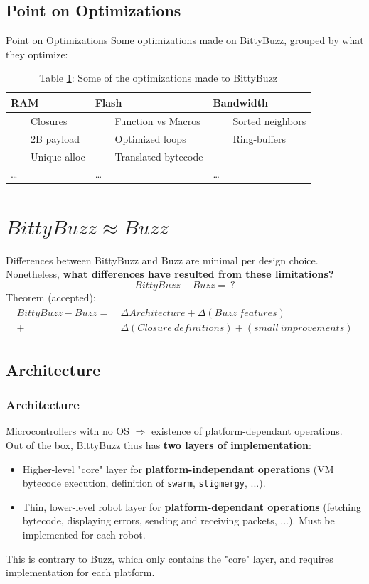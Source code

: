 \documentclass{beamer}
\newcommand{\tabitem}{~~\llap{\color{darkorange}\textbullet}~~}
\begin{document}
	\subsection{Point on Optimizations}
	\begin{frame}{Point on Optimizations}
		Some optimizations made on BittyBuzz, grouped by what they optimize:
		\begin{table}
			\begin{tabular}{l|l|l}
				RAM & Flash & Bandwidth\\
				\hline
				\tabitem Closures & \tabitem Function vs Macros & \tabitem Sorted neighbors\\
				\tabitem 2B payload & \tabitem Optimized loops & \tabitem Ring-buffers\\
				\tabitem Unique alloc & \tabitem Translated bytecode &\\
				\dots & \dots & \dots
			\end{tabular}
			\caption{
				\label{table:Optimizations}Table \ref{table:Optimizations}: Some of the optimizations made to BittyBuzz}
		\end{table}
	\end{frame}
	\section{$BittyBuzz \approx Buzz$}
	\begin{frame}
		Differences between BittyBuzz and Buzz are minimal per design choice. Nonetheless, \textbf{what differences have resulted from these limitations?}\\
		\[BittyBuzz - Buzz =~?\]
		Theorem (accepted):
		\begin{align}
		\begin{split}
		BittyBuzz - Buzz = ~&\Delta Architecture + \Delta (Buzz~features)\\
		+ &\Delta (Closure~definitions) + (small~improvements)
		\end{split}
		\end{align}
	\end{frame}
	\subsection{Architecture}
	\begin{frame}
		\frametitle{Architecture}
		Microcontrollers with no OS $\Rightarrow$ existence of platform-dependant operations.\\
		Out of the box, BittyBuzz thus has \textbf{two layers of implementation}:
		\begin{itemize}
			\item Higher-level "core" layer for \textbf{platform-independant operations} (VM bytecode execution, definition of \texttt{swarm}, \texttt{stigmergy}, ...).
			\item Thin, lower-level robot layer for \textbf{platform-dependant operations} (fetching bytecode, displaying errors, sending and receiving packets, ...). Must be implemented for each robot.
		\end{itemize}
		This is contrary to Buzz, which only contains the "core" layer, and requires implementation for each platform.
	\end{frame}
\end{document}
